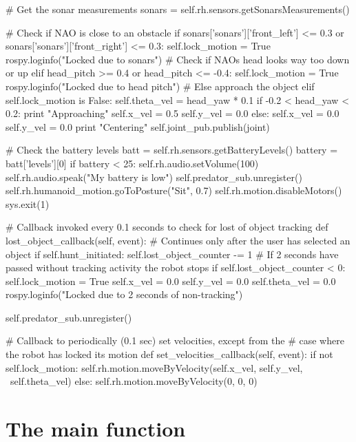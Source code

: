 \begin{DoxyVerb}
    # Get the sonar measurements
    sonars = self.rh.sensors.getSonarsMeasurements()

    # Check if NAO is close to an obstacle
    if sonars['sonars']['front_left'] <= 0.3 or sonars['sonars']['front_right'] <= 0.3:
        self.lock_motion = True
        rospy.loginfo("Locked due to sonars")
    # Check if NAOs head looks way too down or up
    elif head_pitch >= 0.4 or head_pitch <= -0.4:
        self.lock_motion = True
        rospy.loginfo("Locked due to head pitch")
    # Else approach the object
    elif self.lock_motion is False:
        self.theta_vel = head_yaw * 0.1
        if -0.2 < head_yaw < 0.2:
            print "Approaching"
            self.x_vel = 0.5
            self.y_vel = 0.0
        else:
            self.x_vel = 0.0
            self.y_vel = 0.0
            print "Centering"
        self.joint_pub.publish(joint)

    # Check the battery levels
    batt = self.rh.sensors.getBatteryLevels()
    battery = batt['levels'][0]
    if battery < 25:
        self.rh.audio.setVolume(100)
        self.rh.audio.speak("My battery is low")
        self.predator_sub.unregister()
        self.rh.humanoid_motion.goToPosture("Sit", 0.7)
        self.rh.motion.disableMotors()
        sys.exit(1)

# Callback invoked every 0.1 seconds to check for lost of object tracking
def lost_object_callback(self, event):
    # Continues only after the user has selected an object
    if self.hunt_initiated:
        self.lost_object_counter -= 1
        # If 2 seconds have passed without tracking activity the robot stops
        if self.lost_object_counter < 0:
            self.lock_motion = True
            self.x_vel = 0.0
            self.y_vel = 0.0
            self.theta_vel = 0.0
            rospy.loginfo("Locked due to 2 seconds of non-tracking")

            self.predator_sub.unregister()

# Callback to periodically (0.1 sec) set velocities, except from the 
# case where the robot has locked its motion
def set_velocities_callback(self, event):
    if not self.lock_motion:
        self.rh.motion.moveByVelocity(self.x_vel, self.y_vel, \
                self.theta_vel)
    else:
        self.rh.motion.moveByVelocity(0, 0, 0)
\end{DoxyVerb}


\section*{The main function}


